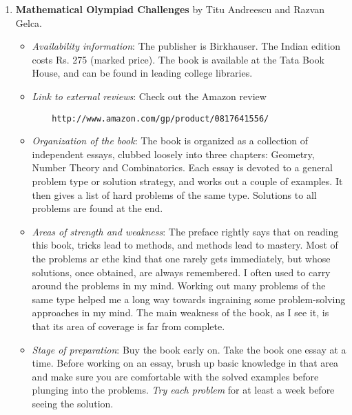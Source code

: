 \documentclass[a4paper]{amsart}
\begin{document}
\begin{enumerate}
\begin{itemize}
  \end{itemize}

\item {\bf Mathematical Olympiad Challenges} by Titu Andreescu and Razvan Gelca. 

  \begin{itemize}

  \item {\em Availability information}: The publisher is Birkhauser. The Indian edition
    costs Rs. 275 (marked price). The book is available at the Tata Book House, and can be found in leading
    college libraries.

  \item {\em Link to external reviews}: Check out the Amazon review

  \begin{verbatim}
    http://www.amazon.com/gp/product/0817641556/
  \end{verbatim}

  \item {\em Organization of the book}: The book is organized as a collection of independent essays, clubbed loosely
    into three chapters: Geometry, Number Theory and Combinatorics. Each essay is devoted to a general problem type
    or solution strategy, and works out a couple of examples. It then gives a list of hard problems of the same type.
    Solutions to all problems are found at the end.

  \item {\em Areas of strength and weakness}: The preface rightly says that on reading this book, tricks lead to methods,
    and methods lead to mastery. Most of the problems ar ethe kind that one rarely gets immediately, but whose solutions,
    once obtained, are always remembered. I often used to carry around the problems in my mind.
    Working out many problems of the same type helped me a long way towards ingraining
    some problem-solving approaches in my mind. The main weakness of the book, as I see it, is that its area of coverage is
    far from complete.

  \item {\em Stage of preparation}: Buy the book early on. Take the book one essay at a time. Before working on an essay,
    brush up basic knowledge in that area and make sure you are comfortable with the solved examples before plunging into the
    problems. {\em Try each problem} for at least a week before seeing the solution.

  \end{itemize}


\end{enumerate}
\end{document}
